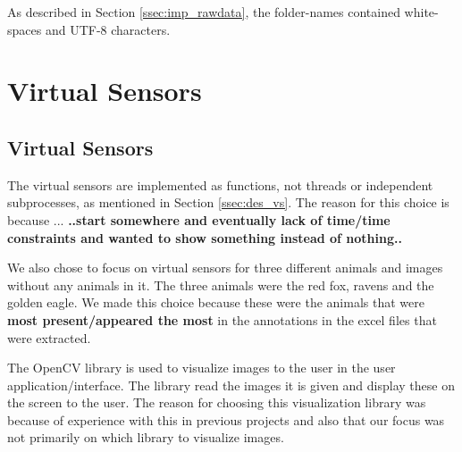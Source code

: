 \documentclass[USenglish]{uit-thesis}
\begin{document}
As described in Section \ref{ssec:imp_rawdata}, the folder-names contained white-spaces and UTF-8 characters. 

\section{Virtual Sensors} \label{sec:imp_virsens}
\subsection{Virtual Sensors} %

The virtual sensors are implemented as functions, not threads or independent subprocesses, as mentioned in Section \ref{ssec:des_vs}. The reason for this choice is because ... \textbf{..start somewhere and eventually lack of time/time constraints and wanted to show something instead of nothing..}



We also chose to focus on virtual sensors for three different animals and images without any animals in it. The three animals were the red fox, ravens and the golden eagle. We made this choice because these were the animals that were \textbf{most present/appeared the most} in the annotations in the excel files that were extracted.



The OpenCV library is used to visualize images to the user in the user application/interface. The library read the images it is given and display these on the screen to the user. The reason for choosing this visualization library was because of experience with this in previous projects and also that our focus was not primarily on which library to visualize images.
\end{document}

